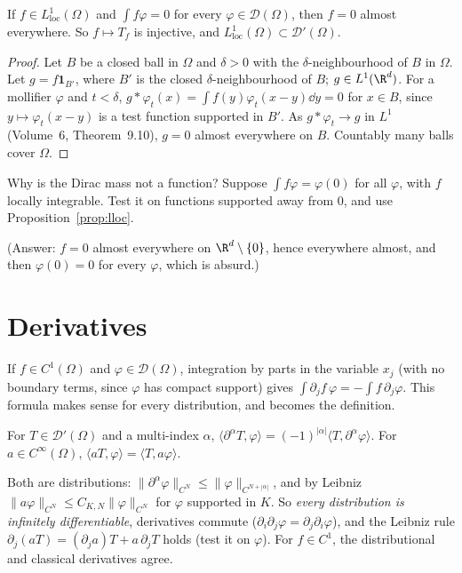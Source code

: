 \begin{proposition}\label{prop:lloc}
If $f\in L^1_{\mathrm{loc}}(\Omega)$ and $\int f\varphi=0$ for every $\varphi\in\mathcal D(\Omega)$, then $f=0$ almost everywhere. So $f\mapsto T_f$ is injective, and $L^1_{\mathrm{loc}}(\Omega)\subset\mathcal D'(\Omega)$.
\end{proposition}
\begin{proof}
Let $B$ be a closed ball in $\Omega$ and $\delta>0$ with the $\delta$-neighbourhood of $B$ in $\Omega$. Let $g=f\mathbf 1_{B'}$, where $B'$ is the closed $\delta$-neighbourhood of $B$; $g\in L^1(\R^d)$. For a mollifier $\varphi$ and
$t<\delta$, $g*\varphi_t(x)=\int f(y)\varphi_t(x-y)\dd y=0$ for $x\in B$, since $y\mapsto\varphi_t(x-y)$ is a test function supported in $B'$. As $g*\varphi_t\to g$ in $L^1$ (Volume~6, Theorem~9.10), $g=0$ almost everywhere on $B$.
Countably many balls cover $\Omega$.
\end{proof}

\begin{think}
Why is the Dirac mass not a function? Suppose $\int f\varphi=\varphi(0)$ for all $\varphi$, with $f$ locally integrable. Test it on functions supported away from $0$, and use Proposition~\ref{prop:lloc}.
\end{think}

(Answer: $f=0$ almost everywhere on $\R^d\setminus\{0\}$, hence everywhere almost, and then $\varphi(0)=0$ for every $\varphi$, which is absurd.)

\section{Derivatives}

If $f\in C^1(\Omega)$ and $\varphi\in\mathcal D(\Omega)$, integration by parts in the variable $x_j$ (with no boundary terms, since $\varphi$ has compact support) gives $\int\partial_jf\,\varphi=-\int f\,\partial_j\varphi$. This formula makes
sense for every distribution, and becomes the definition.

\begin{definition}
For $T\in\mathcal D'(\Omega)$ and a multi-index $\alpha$, $\langle\partial^\alpha T,\varphi\rangle=(-1)^{|\alpha|}\langle T,\partial^\alpha\varphi\rangle$. For $a\in C^\infty(\Omega)$, $\langle aT,\varphi\rangle=\langle T,a\varphi\rangle$.
\end{definition}

Both are distributions: $\|\partial^\alpha\varphi\|_{C^N}\le\|\varphi\|_{C^{N+|\alpha|}}$, and by Leibniz $\|a\varphi\|_{C^N}\le C_{K,N}\|\varphi\|_{C^N}$ for $\varphi$ supported in $K$. So \emph{every distribution is infinitely differentiable},
derivatives commute ($\partial_i\partial_j\varphi=\partial_j\partial_i\varphi$), and the Leibniz rule $\partial_j(aT)=(\partial_ja)T+a\,\partial_jT$ holds (test it on $\varphi$). For $f\in C^1$, the distributional and classical derivatives
agree.

